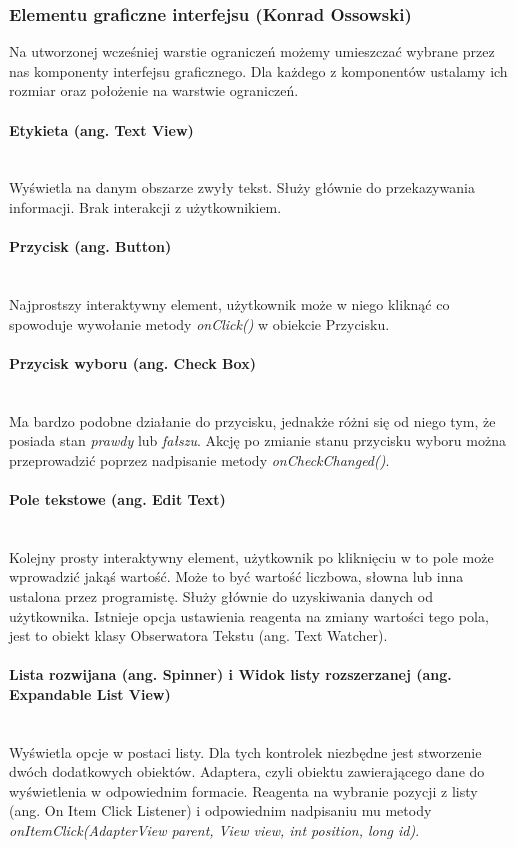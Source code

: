 \subsubsection{Elementu graficzne interfejsu (Konrad Ossowski)}
Na utworzonej wcześniej warstie ograniczeń możemy umieszczać wybrane przez nas komponenty interfejsu graficznego. Dla każdego z komponentów ustalamy ich rozmiar oraz położenie na warstwie ograniczeń.
\paragraph{Etykieta (ang. Text View)}\mbox{}\\
Wyświetla na danym obszarze zwyły tekst. Służy głównie do przekazywania informacji. Brak interakcji z użytkownikiem.\cite{textview}
\paragraph{Przycisk (ang. Button)}\mbox{}\\
Najprostszy interaktywny element, użytkownik może w niego kliknąć co spowoduje wywołanie metody \textit{onClick()} w obiekcie Przycisku. \cite{button}
\paragraph{Przycisk wyboru (ang. Check Box)}\mbox{}\\
Ma bardzo podobne działanie do przycisku, jednakże różni się od niego tym, że posiada stan \textit{prawdy} lub \textit{fałszu}. Akcję po zmianie stanu przycisku wyboru można przeprowadzić poprzez nadpisanie metody \textit{onCheckChanged()}.
\paragraph{Pole tekstowe (ang. Edit Text)}\mbox{}\\
Kolejny prosty interaktywny element, użytkownik po kliknięciu w to pole może wprowadzić jakąś wartość. Może to być wartość liczbowa, słowna lub inna ustalona przez programistę. Służy głównie do uzyskiwania danych od użytkownika. Istnieje opcja ustawienia reagenta na zmiany wartości tego pola, jest to obiekt klasy Obserwatora Tekstu (ang. Text Watcher).\cite{edittext}
\paragraph{Lista rozwijana (ang. Spinner) i Widok listy rozszerzanej (ang. Expandable List View)}\mbox{}\\
Wyświetla opcje w postaci listy. Dla tych kontrolek niezbędne jest stworzenie dwóch dodatkowych obiektów. Adaptera, czyli obiektu zawierającego dane do wyświetlenia w odpowiednim formacie. Reagenta na wybranie pozycji z listy (ang. On Item Click Listener) i odpowiednim nadpisaniu mu metody \textit{onItemClick(AdapterView parent, View view, int position, long id)}.\cite{adapterview}
